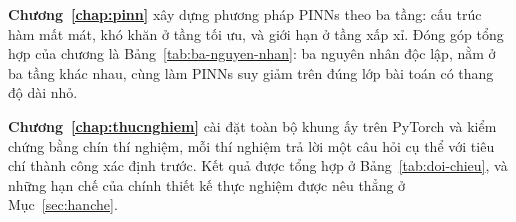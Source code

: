 \textbf{Chương~\ref{chap:pinn}} xây dựng phương pháp PINNs theo ba tầng: cấu trúc
hàm mất mát, khó khăn ở tầng tối ưu, và giới hạn ở tầng xấp xỉ. Đóng góp tổng hợp
của chương là Bảng~\ref{tab:ba-nguyen-nhan}: ba nguyên nhân độc lập, nằm ở ba tầng
khác nhau, cùng làm PINNs suy giảm trên đúng lớp bài toán có thang độ dài nhỏ.
 
\textbf{Chương~\ref{chap:thucnghiem}} cài đặt toàn bộ khung ấy trên PyTorch và
kiểm chứng bằng chín thí nghiệm, mỗi thí nghiệm trả lời một câu hỏi cụ thể với tiêu
chí thành công xác định trước. Kết quả được tổng hợp ở Bảng~\ref{tab:doi-chieu},
và những hạn chế của chính thiết kế thực nghiệm được nêu thẳng ở
Mục~\ref{sec:hanche}.